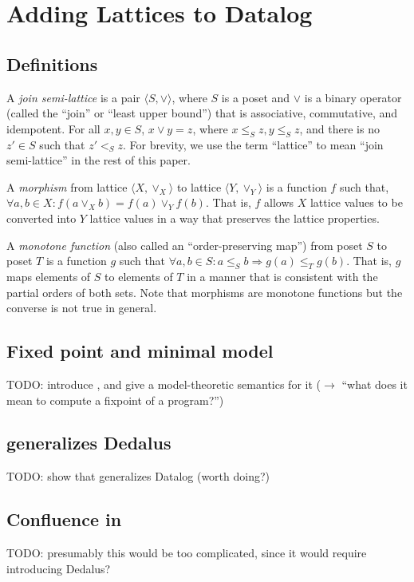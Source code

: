 \section{Adding Lattices to Datalog}
\label{sec:foundation}

\subsection{Definitions}

A \emph{join semi-lattice} is a pair $\langle S, \lor \rangle$, where $S$ is a
poset and $\lor$ is a binary operator (called the ``join'' or ``least upper
bound'') that is associative, commutative, and idempotent. For all $x, y \in S$,
$x \lor y = z$, where $x \leq_S z, y \leq_S z$, and there is no $z' \in S$ such
that $z' <_S z$. For brevity, we use the term ``lattice'' to mean ``join
semi-lattice'' in the rest of this paper.

A \emph{morphism} from lattice $\langle X, \lor_X\rangle$ to lattice $\langle Y,
\lor_Y\rangle$ is a function $f$ such that, $\forall a,b \in X: f(a \lor_X b) =
f(a) \lor_Y f(b)$. That is, $f$ allows $X$ lattice values to be converted into
$Y$ lattice values in a way that preserves the lattice properties.

A \emph{monotone function} (also called an ``order-preserving map'') from poset
$S$ to poset $T$ is a function $g$ such that $\forall a,b \in S: a \leq_S b
\Rightarrow g(a) \leq_T g(b)$. That is, $g$ maps elements of $S$ to elements of
$T$ in a manner that is consistent with the partial orders of both sets. Note
that morphisms are monotone functions but the converse is not true in general.

\subsection{Fixed point and minimal model}

TODO: introduce \baselang, and give a model-theoretic semantics for it ($\to$
``what does it mean to compute a fixpoint of a \baselang program?'')

\subsection{\baselang generalizes Dedalus}

TODO: show that \baselang generalizes Datalog (worth doing?)

\subsection{Confluence in \baselang}

TODO: presumably this would be too complicated, since it would require
introducing Dedalus?
